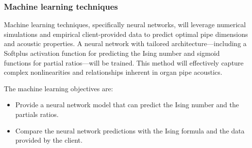 \documentclass{psu-plan}
\begin{document}
\subsubsection{Machine learning techniques}



Machine learning techniques, specifically neural networks, will leverage numerical simulations and empirical 
client-provided data to predict optimal pipe dimensions and acoustic properties. 
A neural network with tailored architecture—including a Softplus activation function for predicting the 
Ising number and sigmoid functions for partial ratios—will be trained. 
This method will effectively capture complex nonlinearities and relationships inherent in organ pipe acoustics.

The machine learning objectives are:
\begin{itemize}
    \item Provide a neural network model that can predict the Ising number and
        the partials ratios.
    \item Compare the neural network predictions with the Ising formula and the
        data provided by the client.
\end{itemize}


\end{document}
